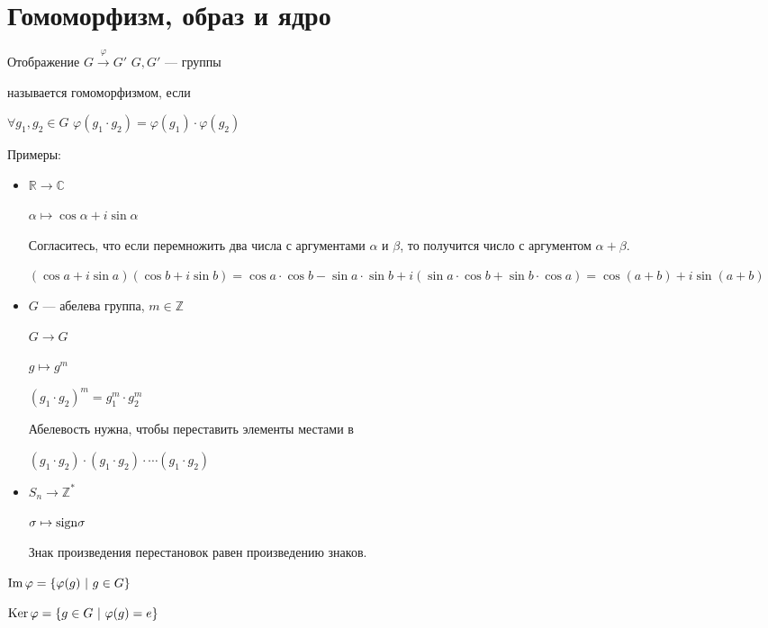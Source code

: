 \section{Гомоморфизм, образ и ядро}

\begin{conj}
    Отображение $G \stackrel{\varphi}{\longrightarrow} G'$ $G, G'$ --- группы
  
    называется гомоморфизмом, если 
  
    $\forall g_1, g_2 \in G$ $\varphi(g_1 \cdot g_2) = \varphi(g_1) \cdot \varphi(g_2)$
  \end{conj}
  
  Примеры:
  \begin{itemize}
    \item $\mathbb{R} \longrightarrow \mathbb{C}$
    
    $\alpha \mapsto \cos{\alpha} + i\sin{\alpha}$
  
    Согласитесь, что если перемножить два числа с аргументами $\alpha$ и $\beta$, то получится число с аргументом $\alpha + \beta$.
  
    $(\cos{a} + i\sin{a})(\cos{b} + i\sin{b}) = \cos{a}\cdot\cos{b} - \sin{a}\cdot\sin{b} + i(\sin{a}\cdot\cos{b} + \sin{b}\cdot\cos{a}) = \cos(a + b) + i\sin(a + b)$
  
    \item $G$ --- абелева группа, $m\in \mathbb{Z}$
    
    $G \longrightarrow G$
  
    $g \mapsto g^m$
  
    $(g_1 \cdot g_2)^m = g_1^m \cdot g_2^m$
    
    Абелевость нужна, чтобы переставить элементы местами в 
    
    $(g_1 \cdot g_2) \cdot (g_1 \cdot g_2) \cdot \cdots (g_1 \cdot g_2)$
  
    \item  $S_n \longrightarrow \mathbb{Z}^*$
  
    $\sigma \mapsto \operatorname{sign \sigma}$
  
    Знак произведения перестановок равен произведению знаков.
  \end{itemize}
  
  \begin{conj}
    $\operatorname{Im} {\varphi} = \{ \varphi(g)\ |\ g\in G \}$
  
    $\operatorname{Ker}{\varphi} = \{ g \in G\ |\ \varphi(g) = e \}$
  \end{conj}
  
